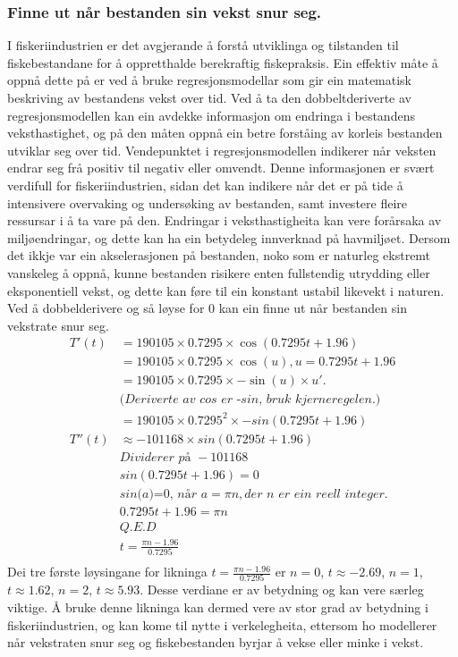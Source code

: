 \documentclass{report}
\begin{document}
\subsubsection{Finne ut når bestanden sin vekst snur seg.}
I fiskeriindustrien er det avgjerande å forstå utviklinga og tilstanden til fiskebestandane for å oppretthalde berekraftig fiskepraksis.
Ein effektiv måte å oppnå dette på er ved å bruke regresjonsmodellar som gir ein matematisk beskriving av bestandens vekst over tid.
Ved å ta den dobbeltderiverte av regresjonsmodellen kan ein avdekke informasjon om endringa i bestandens veksthastighet, og på den måten oppnå ein betre forståing av korleis bestanden utviklar seg over tid.
Vendepunktet i regresjonsmodellen indikerer når veksten endrar seg frå positiv til negativ eller omvendt.
Denne informasjonen er svært verdifull for fiskeriindustrien, sidan det kan indikere når det er på tide å intensivere overvaking og undersøking av bestanden, samt investere fleire ressursar i å ta vare på den.
Endringar i veksthastigheita kan vere forårsaka av miljøendringar, og dette kan ha ein betydeleg innverknad på havmiljøet.
Dersom det ikkje var ein akselerasjonen på bestanden, noko som er naturleg ekstremt vanskeleg å oppnå, kunne bestanden risikere enten fullstendig utrydding eller eksponentiell vekst, og dette kan føre til ein konstant ustabil likevekt i naturen.
Ved å dobbelderivere og så løyse for 0 kan ein finne ut når bestanden sin vekstrate snur seg.
\begin{align*}
    T'(t) &= 190105 \times 0.7295 \times \cos(0.7295t+1.96) \\ 
    &= 190105 \times 0.7295 \times \cos(u), u=0.7295t+1.96 \\
    &= 190105 \times 0.7295 \times -\sin(u) \times u'. \\
    & \textit{(Deriverte av cos er -sin, bruk kjerneregelen.)} \\
    &= 190105\times 0.7295^{2}\times -sin(0.7295t+1.96) \\
    T''(t) & \approx -101168 \times sin(0.7295t+1.96) \\ 
    & \textit{Dividerer på } -101168 \\
    & sin(0.7295t+1.96) = 0 \\
    & \textit{sin(a)=0, når } a=\pi n, \textit{der n er ein reell integer.} \\
    & 0.7295t+1.96 =\pi n \\
    & Q.E.D \\
    & t= \frac{\pi n -1.96}{0.7295} \\
\end{align*}
Dei tre første løysingane for likninga $t=\frac{\pi n -1.96}{0.7295}$ er $n=0$, $t\approx -2.69$, $n=1$, $t\approx 1.62$, $n=2$, $t\approx 5.93$. Desse verdiane er av betydning og kan vere særleg viktige. Å bruke denne likninga kan dermed vere av stor grad av betydning i fiskeriindustrien, og kan kome til nytte i verkelegheita, ettersom ho modellerer når vekstraten snur seg og fiskebestanden byrjar å vekse eller minke i vekst.
\end{document}
